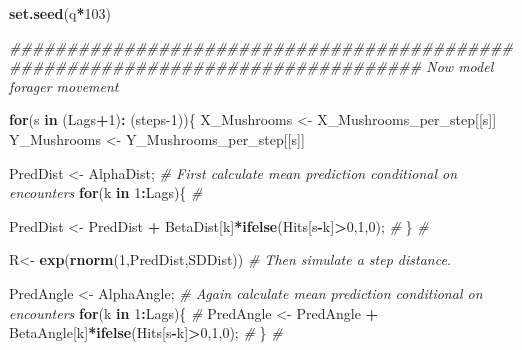 \documentclass[
]{article}
\newenvironment{Shaded}{\begin{snugshade}}{\end{snugshade}}
\newcommand{\CommentTok}[1]{\textcolor[rgb]{0.56,0.35,0.01}{\textit{#1}}}
\newcommand{\ControlFlowTok}[1]{\textcolor[rgb]{0.13,0.29,0.53}{\textbf{#1}}}
\newcommand{\DecValTok}[1]{\textcolor[rgb]{0.00,0.00,0.81}{#1}}
\newcommand{\KeywordTok}[1]{\textcolor[rgb]{0.13,0.29,0.53}{\textbf{#1}}}
\newcommand{\NormalTok}[1]{#1}
\newcommand{\OperatorTok}[1]{\textcolor[rgb]{0.81,0.36,0.00}{\textbf{#1}}}
\newcommand{\StringTok}[1]{\textcolor[rgb]{0.31,0.60,0.02}{#1}}
\begin{document}
\begin{Shaded}
\begin{Highlighting}[]
\KeywordTok{set.seed}\NormalTok{(q}\OperatorTok{*}\DecValTok{103}\NormalTok{)}

\CommentTok{################################################################################ Now model forager movement}

\ControlFlowTok{for}\NormalTok{(s }\ControlFlowTok{in}\NormalTok{ (Lags}\OperatorTok{+}\DecValTok{1}\NormalTok{)}\OperatorTok{:}\StringTok{ }\NormalTok{(steps}\DecValTok{-1}\NormalTok{))\{                                                  }
\NormalTok{ X_Mushrooms <-}\StringTok{ }\NormalTok{X_Mushrooms_per_step[[s]]}
\NormalTok{ Y_Mushrooms <-}\StringTok{ }\NormalTok{Y_Mushrooms_per_step[[s]]}

\NormalTok{ PredDist <-}\StringTok{ }\NormalTok{AlphaDist;                                                         }\CommentTok{# First calculate mean prediction conditional on encounters}
\ControlFlowTok{for}\NormalTok{(k }\ControlFlowTok{in} \DecValTok{1}\OperatorTok{:}\NormalTok{Lags)\{                                                               }\CommentTok{#    }
   
\NormalTok{  PredDist <-}\StringTok{ }\NormalTok{PredDist }\OperatorTok{+}\StringTok{ }\NormalTok{BetaDist[k]}\OperatorTok{*}\KeywordTok{ifelse}\NormalTok{(Hits[s}\OperatorTok{-}\NormalTok{k]}\OperatorTok{>}\DecValTok{0}\NormalTok{,}\DecValTok{1}\NormalTok{,}\DecValTok{0}\NormalTok{);                                  }\CommentTok{#}
\NormalTok{       \}                                                                        }\CommentTok{#}

\NormalTok{ R<-}\StringTok{ }\KeywordTok{exp}\NormalTok{(}\KeywordTok{rnorm}\NormalTok{(}\DecValTok{1}\NormalTok{,PredDist,SDDist))                                              }\CommentTok{# Then simulate a step distance. }
    
\NormalTok{ PredAngle <-}\StringTok{ }\NormalTok{AlphaAngle;                                                       }\CommentTok{# Again calculate mean prediction conditional on encounters}
\ControlFlowTok{for}\NormalTok{(k }\ControlFlowTok{in} \DecValTok{1}\OperatorTok{:}\NormalTok{Lags)\{                                                               }\CommentTok{#    }
\NormalTok{ PredAngle <-}\StringTok{ }\NormalTok{PredAngle }\OperatorTok{+}\StringTok{ }\NormalTok{BetaAngle[k]}\OperatorTok{*}\KeywordTok{ifelse}\NormalTok{(Hits[s}\OperatorTok{-}\NormalTok{k]}\OperatorTok{>}\DecValTok{0}\NormalTok{,}\DecValTok{1}\NormalTok{,}\DecValTok{0}\NormalTok{);                              }\CommentTok{#}
\NormalTok{        \}                                                                       }\CommentTok{#}
                

\end{Highlighting}
\end{Shaded}
\end{document}
